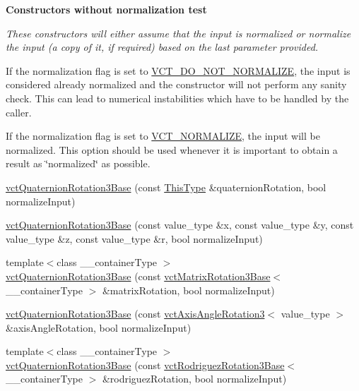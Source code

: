 \begin{Indent}{\bf Constructors without normalization test}\par
{\em These constructors will either assume that the input is normalized or normalize the input (a copy of it, if required) based on the last parameter provided.


\begin{DoxyItemize}
\item If the normalization flag is set to \hyperlink{vct_forward_declarations_8h_a6fd516b0c35fa9967b4da5f03a788985}{V\+C\+T\+\_\+\+D\+O\+\_\+\+N\+O\+T\+\_\+\+N\+O\+R\+M\+A\+L\+I\+Z\+E}, the input is considered already normalized and the constructor will not perform any sanity check. This can lead to numerical instabilities which have to be handled by the caller.


\item If the normalization flag is set to \hyperlink{vct_forward_declarations_8h_ae54c682b919a7c5743ea498810518565}{V\+C\+T\+\_\+\+N\+O\+R\+M\+A\+L\+I\+Z\+E}, the input will be normalized. This option should be used whenever it is important to obtain a result as \char`\"{}normalized\char`\"{} as possible.


\end{DoxyItemize}}\begin{DoxyCompactItemize}
\item 
\hyperlink{classvct_quaternion_rotation3_base_ae8f0b3b79b368f80ea333f2bff792e79}{vct\+Quaternion\+Rotation3\+Base} (const \hyperlink{classvct_quaternion_base_af28efdc38acf89acb7a67afada11408c}{This\+Type} \&quaternion\+Rotation, bool normalize\+Input)
\item 
\hyperlink{classvct_quaternion_rotation3_base_a07d0b2ed8314011b0bb68f195df0fbef}{vct\+Quaternion\+Rotation3\+Base} (const value\+\_\+type \&x, const value\+\_\+type \&y, const value\+\_\+type \&z, const value\+\_\+type \&r, bool normalize\+Input)
\item 
{\footnotesize template$<$class \+\_\+\+\_\+container\+Type $>$ }\\\hyperlink{classvct_quaternion_rotation3_base_ac9035beb866ddfa729366b5098dab49d}{vct\+Quaternion\+Rotation3\+Base} (const \hyperlink{classvct_matrix_rotation3_base}{vct\+Matrix\+Rotation3\+Base}$<$ \+\_\+\+\_\+container\+Type $>$ \&matrix\+Rotation, bool normalize\+Input)
\item 
\hyperlink{classvct_quaternion_rotation3_base_a4dc7f240e97a06c7b8bac87b0aa7ed11}{vct\+Quaternion\+Rotation3\+Base} (const \hyperlink{classvct_axis_angle_rotation3}{vct\+Axis\+Angle\+Rotation3}$<$ value\+\_\+type $>$ \&axis\+Angle\+Rotation, bool normalize\+Input)
\item 
{\footnotesize template$<$class \+\_\+\+\_\+container\+Type $>$ }\\\hyperlink{classvct_quaternion_rotation3_base_af05d7939df2800a9a541ed9bac3698e0}{vct\+Quaternion\+Rotation3\+Base} (const \hyperlink{classvct_rodriguez_rotation3_base}{vct\+Rodriguez\+Rotation3\+Base}$<$ \+\_\+\+\_\+container\+Type $>$ \&rodriguez\+Rotation, bool normalize\+Input)
\end{DoxyCompactItemize}
\end{Indent}
